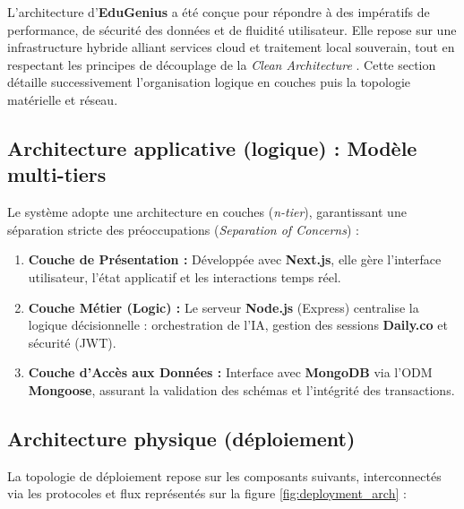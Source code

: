 L'architecture d'\textbf{EduGenius} a été conçue pour répondre à des impératifs de performance, de sécurité des données et de fluidité utilisateur. Elle repose sur une infrastructure hybride alliant services cloud et traitement local souverain, tout en respectant les principes de découplage de la \textit{Clean Architecture} \cite{clean_architecture}. Cette section détaille successivement l’organisation logique en couches puis la topologie matérielle et réseau.

\subsection{Architecture applicative (logique) : Modèle multi-tiers}

Le système adopte une architecture en couches (\textit{n-tier}), garantissant une séparation stricte des préoccupations (\textit{Separation of Concerns}) :

\begin{enumerate}
    \item \textbf{Couche de Présentation :} Développée avec \textbf{Next.js}, elle gère l'interface utilisateur, l'état applicatif et les interactions temps réel.
    \item \textbf{Couche Métier (Logic) :} Le serveur \textbf{Node.js} (Express) centralise la logique décisionnelle : orchestration de l'IA, gestion des sessions \textbf{Daily.co} et sécurité (JWT).
    \item \textbf{Couche d'Accès aux Données :} Interface avec \textbf{MongoDB} via l'ODM \textbf{Mongoose}, assurant la validation des schémas et l'intégrité des transactions.
\end{enumerate}

\subsection{Architecture physique (déploiement)}

La topologie de déploiement repose sur les composants suivants, interconnectés via les protocoles et flux représentés sur la figure \ref{fig:deployment_arch} :

